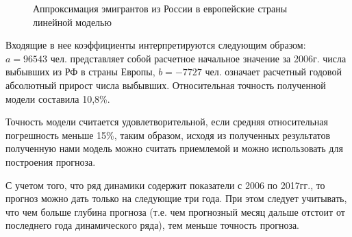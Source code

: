 \documentclass{article}
\begin{document}
\begin{figure}[h]
\centering
{}
\caption{Аппроксимация эмигрантов из России в европейские страны линейной моделью}
\end{figure}

\newline Входящие в нее коэффициенты интерпретируются следующим образом: $a = 96543$ чел. представляет собой расчетное начальное значение за 2006г. числа выбывших из РФ в страны Европы, $b = -7727$ чел. означает расчетный годовой абсолютный прирост числа выбывших. Относительная точность полученной модели составила 10,8\%.

\newline Точность модели считается удовлетворительной, если средняя относительная погрешность меньше 15\%, таким образом, исходя из полученных результатов полученную нами модель можно считать приемлемой и можно использовать для построения прогноза.

\newline С учетом того, что ряд динамики содержит показатели с 2006 по 2017гг., то прогноз можно дать только на следующие три года. При этом следует учитывать, что чем больше глубина прогноза (т.е. чем прогнозный месяц дальше отстоит от последнего года динамического ряда), тем меньше точность прогноза.
\end{document}
